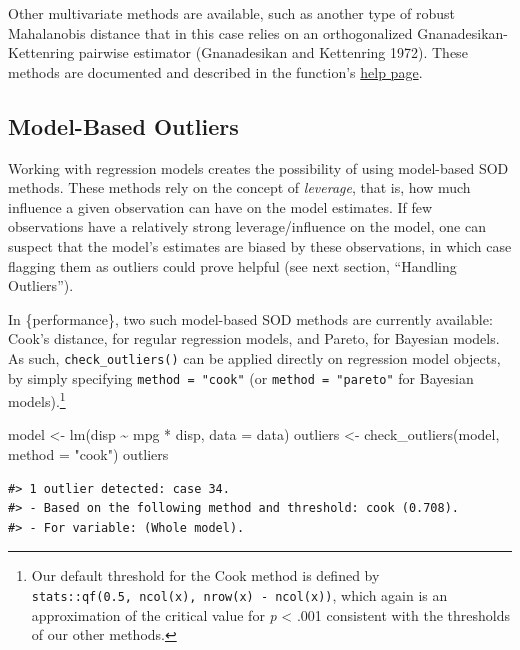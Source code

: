 \documentclass{article}
\newenvironment{Shaded}{\begin{snugshade}}{\end{snugshade}}
\newcommand{\AttributeTok}[1]{\textcolor[rgb]{0.77,0.63,0.00}{#1}}
\newcommand{\FunctionTok}[1]{\textcolor[rgb]{0.00,0.00,0.00}{#1}}
\newcommand{\NormalTok}[1]{#1}
\newcommand{\OtherTok}[1]{\textcolor[rgb]{0.56,0.35,0.01}{#1}}
\newcommand{\SpecialCharTok}[1]{\textcolor[rgb]{0.00,0.00,0.00}{#1}}
\newcommand{\StringTok}[1]{\textcolor[rgb]{0.31,0.60,0.02}{#1}}
\begin{document}
Other multivariate methods are available, such as another type of robust
Mahalanobis distance that in this case relies on an orthogonalized
Gnanadesikan-Kettenring pairwise estimator (Gnanadesikan and Kettenring
1972). These methods are documented and described in the function's
\href{https://easystats.github.io/performance/reference/check_outliers.html}{help
page}.

\hypertarget{model-based-outliers}{%
\subsection{Model-Based Outliers}\label{model-based-outliers}}

Working with regression models creates the possibility of using
model-based SOD methods. These methods rely on the concept of
\emph{leverage}, that is, how much influence a given observation can
have on the model estimates. If few observations have a relatively
strong leverage/influence on the model, one can suspect that the model's
estimates are biased by these observations, in which case flagging them
as outliers could prove helpful (see next section, ``Handling
Outliers'').

In \{performance\}, two such model-based SOD methods are currently
available: Cook's distance, for regular regression models, and Pareto,
for Bayesian models. As such, \texttt{check\_outliers()} can be applied
directly on regression model objects, by simply specifying
\texttt{method\ =\ "cook"} (or \texttt{method\ =\ "pareto"} for Bayesian
models).\footnote{Our default threshold for the Cook method is defined
  by \texttt{stats::qf(0.5,\ ncol(x),\ nrow(x)\ -\ ncol(x))}, which
  again is an approximation of the critical value for \emph{p}
  \textless{} .001 consistent with the thresholds of our other methods.}

\begin{Shaded}
\begin{Highlighting}[]
\NormalTok{model }\OtherTok{\textless{}{-}} \FunctionTok{lm}\NormalTok{(disp }\SpecialCharTok{\textasciitilde{}}\NormalTok{ mpg }\SpecialCharTok{*}\NormalTok{ disp, }\AttributeTok{data =}\NormalTok{ data)}
\NormalTok{outliers }\OtherTok{\textless{}{-}} \FunctionTok{check\_outliers}\NormalTok{(model, }\AttributeTok{method =} \StringTok{"cook"}\NormalTok{)}
\NormalTok{outliers}
\end{Highlighting}
\end{Shaded}

\begin{verbatim}
#> 1 outlier detected: case 34.
#> - Based on the following method and threshold: cook (0.708).
#> - For variable: (Whole model).
\end{verbatim}
\end{document}
